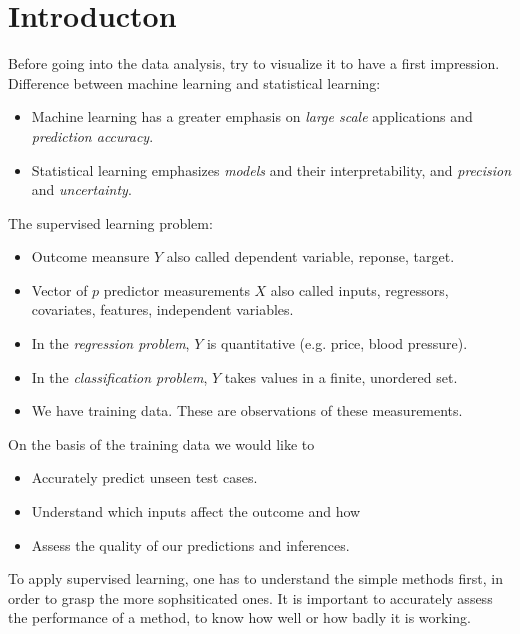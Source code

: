 \documentclass[11pt, a4paper]{article}
\begin{document}
\graphicspath{{"/home/cao/Dropbox/thesis/Documents/Notes/statlearning/img/"}}
\maketitle
\pagestyle{plain}
\section{Introducton}
Before going into the data analysis, try to visualize it to have a first impression.\\
Difference between machine learning and statistical learning:
\begin{itemize}
\item Machine learning has a greater emphasis on \emph{large scale} applications and \emph{prediction accuracy}.
\item Statistical learning emphasizes \emph{models} and their interpretability, and \emph{precision} and \emph{uncertainty}.
\end{itemize}
The supervised learning problem: 
\begin{itemize}
  \item Outcome meansure $Y$ also called dependent variable, reponse, target.
  \item Vector of $p$ predictor measurements $X$ also called inputs, regressors, covariates, features, independent variables.
  \item In the \emph{regression problem}, $Y$ is quantitative (e.g. price, blood pressure).
  \item In the \emph{classification problem}, $Y$ takes values in a finite, unordered set.
  \item We have training data. These are observations of these measurements.
  \end{itemize}
  On the basis of the training data we would like to 
  \begin{itemize}
    \item Accurately predict unseen test cases.
    \item Understand which inputs affect the outcome and how
    \item Assess the quality of our predictions and inferences.
    \end{itemize}
To apply supervised learning, one has to understand the simple methods first, in order to grasp the more sophsiticated ones. It is important to accurately assess the performance of a method, to know how well or how badly it is working.\par
\end{document}

